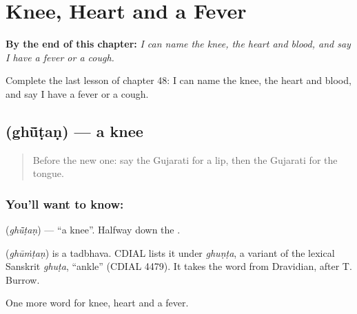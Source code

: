 
\chapter{Knee, Heart and a Fever}
\label{ch:gu-knee-heart-and-a-fever}

\begin{chapteropening}
\textbf{By the end of this chapter:} \emph{I can name the knee, the heart and blood, and say I have a fever or a cough.}

Complete the last lesson of chapter 48: I can name the knee, the heart and blood, and say I have a fever or a cough.
\end{chapteropening}

\section[\texorpdfstring{\gu{ઘૂંટણ} (ghū̃ṭaṇ)}{ઘૂંટણ (ghū̃ṭaṇ)}]{ (ghū̃ṭaṇ) — a knee}

\label{lesson:GU-C48-knee}



\begin{quote}
Before the new one: say the Gujarati for a lip, then the Gujarati for the tongue.
\end{quote}

\subsection*{You'll want to know: }
\textbf{} (\emph{ghū̃ṭaṇ}) — \textquotedblleft{}a knee\textquotedblright{}. Halfway down the \textbf{}.

\begin{cousinweb}
\textbf{} (\emph{ghūṁṭaṇ}) is a tadbhava. CDIAL lists it under \emph{ghuṇṭa}, a variant of the lexical Sanskrit \emph{ghuṭa}, \textquotedblleft{}ankle\textquotedblright{} (CDIAL 4479). It takes the word from Dravidian, after T. Burrow.
\end{cousinweb}

\begin{grammarlens}[title={What you've built}]
One more word for knee, heart and a fever.
\end{grammarlens}

